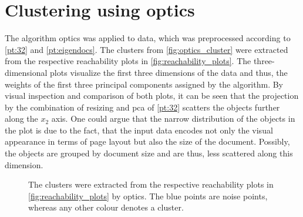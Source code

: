 \section{Clustering using \acs{optics}}\label{sec:evaluation-OPTICS}
The algorithm \ac{optics} was applied to data, which was preprocessed according to \autoref{pt:32} and \autoref{pt:eigendocs}.
The clusters from \autoref{fig:optics_cluster} were extracted from the respective reachability plots in \autoref{fig:reachability_plots}.
The three-dimensional plots visualize the first three dimensions of the data and thus, the weights of the first three principal components assigned by the \eigendocs{} algorithm.
By visual inspection and comparison of both plots, 
it can be seen that the projection by the combination of resizing and \ac{pca} of \autoref{pt:32} scatters the objects further along the $x_2$ axis.
One could argue that the narrow distribution of the objects in the \eigendocs{} plot is due to the fact, 
that the input data encodes not only the visual appearance in terms of page layout but also the size of the document.
Possibly, the objects are grouped by document size and are thus, less scattered along this dimension.

\begin{figure}%
    \centering
    \qquad
    \caption[\ac{optics} clusters]{The clusters were extracted from the respective reachability plots in \autoref{fig:reachability_plots} by \ac{optics}.
    The blue points are noise points, whereas any other colour denotes a cluster.}%
    \label{fig:optics_cluster}%
\end{figure}



